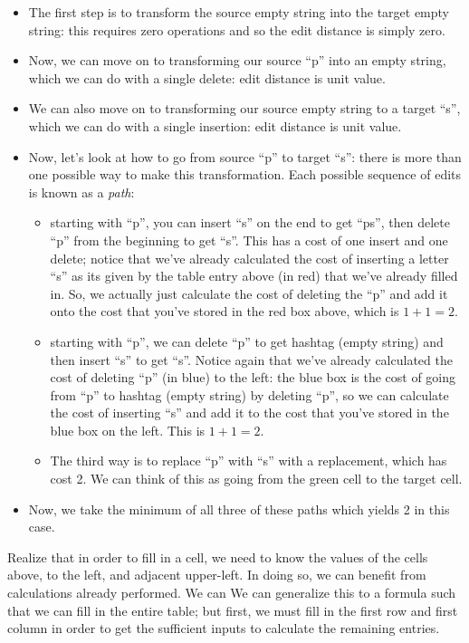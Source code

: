 \documentclass[12pt]{article}
\begin{document}
\begin{itemize}
\item The first step is to transform the source empty string into the target empty string: this requires zero operations and so the edit distance is simply zero.
\item Now, we can move on to transforming our source ``p'' into an empty string,   which we can do with a single delete: edit distance is unit value.
\item We can also move on to transforming our source empty string to a target   ``s'', which we can do with a single insertion: edit distance is unit value.
\item Now, let's look at how to go from source ``p'' to target ``s'': there is more than one possible way to make this transformation. Each possible sequence of edits is known as a \emph{path}:
  \begin{itemize}
    \item starting with ``p'', you can insert ``s'' on the end to get ``ps'', then delete ``p'' from the beginning to get ``s''. This has a cost of one insert and one delete; notice that we've already calculated the cost of inserting a letter ``s'' as its given by the table entry above (in red) that we've already filled in. So, we actually just calculate the cost of deleting the ``p'' and add it onto the cost that you've stored in the red box above, which is $1+1 = 2$.
    \item starting with ``p'', we can delete ``p'' to get hashtag (empty string) and then insert ``s'' to get ``s''. Notice again that we've already calculated the cost of deleting ``p'' (in blue) to the left: the blue box is the cost of going from ``p'' to hashtag (empty string) by deleting ``p'', so we can calculate the cost of inserting ``s'' and add it to the cost that you've stored in the blue box on the left. This is $1 + 1 = 2$.
\item The third way is to replace ``p'' with ``s'' with a replacement, which has cost 2. We can think of this as going from the green cell to the target cell.
\end{itemize}
\item Now, we take the minimum of all three of these paths which yields 2 in this case.
\end{itemize}

Realize that in order to fill in a cell, we need to know the values of the cells above, to the left, and adjacent upper-left. In doing so, we can benefit from calculations already performed. We can We can generalize this to a formula such that we can fill in the entire table; but first, we must fill in the first row and first column in order to get the sufficient inputs to calculate the remaining entries.
\end{document}
